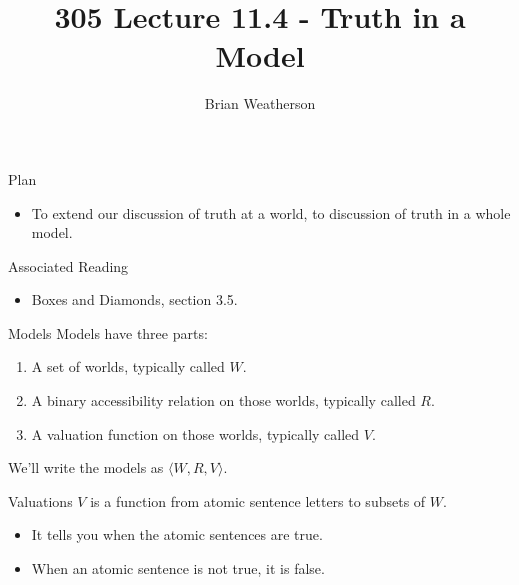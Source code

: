 \documentclass[
  ignorenonframetext,
]{beamer}
\title{305 Lecture 11.4 - Truth in a Model}
\author{Brian Weatherson}
\date{}
\providecommand{\tightlist}{%
  \setlength{\itemsep}{0pt}\setlength{\parskip}{0pt}}
\renewcommand{\,}{\text{, }}
\begin{document}
\frame{\titlepage}

\begin{frame}{Plan}
\protect\hypertarget{plan}{}
\begin{itemize}
\tightlist
\item
  To extend our discussion of truth at a world, to discussion of truth
  in a whole model.
\end{itemize}
\end{frame}

\begin{frame}{Associated Reading}
\protect\hypertarget{associated-reading}{}
\begin{itemize}
\tightlist
\item
  Boxes and Diamonds, section 3.5.
\end{itemize}
\end{frame}

\begin{frame}{Models}
\protect\hypertarget{models}{}
Models have three parts:

\begin{enumerate}
\tightlist
\item
  A set of worlds, typically called \(W\). \pause
\item
  A binary accessibility relation on those worlds, typically called
  \(R\). \pause
\item
  A valuation function on those worlds, typically called \(V\). \pause
\end{enumerate}

We'll write the models as \(\langle W, R, V\rangle\).
\end{frame}

\begin{frame}{Valuations}
\protect\hypertarget{valuations}{}
\(V\) is a function from atomic sentence letters to subsets of \(W\).

\begin{itemize}
\tightlist
\item
  It tells you when the atomic sentences are true.
\item
  When an atomic sentence is not true, it is false.
\end{itemize}
\end{frame}
\end{document}
